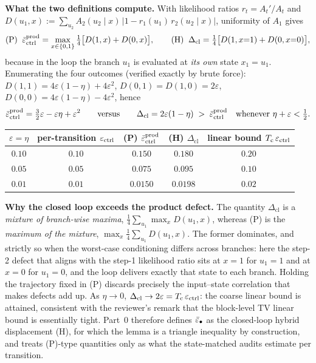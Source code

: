 \documentclass[10pt]{article}
\begin{document}
\noindent\textbf{What the two definitions compute.}
With likelihood ratios $r_t=A_t'/A_t$ and
$D(u_1,x):=\sum_{u_2}A_2(u_2\mid x)\,\lvert 1-r_1(u_1)\,r_2(u_2\mid x)\rvert$,
uniformity of $A_1$ gives
\[
  \text{(P)}\;\; \bar\varepsilon_{\mathrm{ctrl}}^{\mathrm{prod}}=\max_{x\in\{0,1\}}\tfrac14\bigl[D(1,x)+D(0,x)\bigr],
  \qquad
  \text{(H)}\;\; \Delta_{\mathrm{cl}}=\tfrac14\bigl[D(1,x{=}1)+D(0,x{=}0)\bigr],
\]
because in the loop the branch $u_1$ is evaluated at \emph{its own} state
$x_1=u_1$. Enumerating the four outcomes (verified exactly by brute force):
$D(1,1)=4\varepsilon(1-\eta)+4\varepsilon^2$, $D(0,1)=D(1,0)=2\varepsilon$,
$D(0,0)=4\varepsilon(1-\eta)-4\varepsilon^2$, hence
\[
  \bar\varepsilon_{\mathrm{ctrl}}^{\mathrm{prod}}=\tfrac32\varepsilon-\varepsilon\eta+\varepsilon^2
  \qquad\text{versus}\qquad
  \Delta_{\mathrm{cl}}=2\varepsilon(1-\eta)\;>\;\bar\varepsilon_{\mathrm{ctrl}}^{\mathrm{prod}}
  \quad\text{whenever }\eta+\varepsilon<\tfrac12 .
\]
\begin{center}\small
\begin{tabular}{@{}ccccc@{}}
\toprule
$\varepsilon=\eta$ & per-transition $\varepsilon_{\mathrm{ctrl}}$ & (P) $\bar\varepsilon_{\mathrm{ctrl}}^{\mathrm{prod}}$ & (H) $\Delta_{\mathrm{cl}}$ & linear bound $T_{\mathrm{c}}\,\varepsilon_{\mathrm{ctrl}}$ \\
\midrule
$0.10$ & $0.10$ & $0.150$ & $0.180$ & $0.20$ \\
$0.05$ & $0.05$ & $0.075$ & $0.095$ & $0.10$ \\
$0.01$ & $0.01$ & $0.0150$ & $0.0198$ & $0.02$ \\
\bottomrule
\end{tabular}
\end{center}

\noindent\textbf{Why the closed loop exceeds the product defect.}
The quantity $\Delta_{\mathrm{cl}}$ is a \emph{mixture of branch-wise
maxima}, $\tfrac14\sum_{u_1}\max_x D(u_1,x)$, whereas (P) is the
\emph{maximum of the mixture}, $\max_x\tfrac14\sum_{u_1}D(u_1,x)$. The former dominates, and
strictly so when the worst-case conditioning differs across branches: here the step-2
defect that aligns with the step-1 likelihood ratio sits at $x{=}1$ for
$u_1{=}1$ and at $x{=}0$ for $u_1{=}0$, and the loop delivers exactly that
state to each branch. Holding the trajectory fixed in (P) discards precisely
the input--state correlation that makes defects add up. As $\eta\to0$,
$\Delta_{\mathrm{cl}}\to2\varepsilon=T_{\mathrm{c}}\,\varepsilon_{\mathrm{ctrl}}$: the coarse linear
bound is attained, consistent with the reviewer's remark that the block-level
TV linear bound is essentially tight. Part~0 therefore defines
$\bar\varepsilon_{\mathrm{\bullet}}$ as the closed-loop hybrid displacement (H), for which the
lemma is a triangle inequality by construction, and treats (P)-type
quantities only as what the state-matched audits estimate per transition.
\end{document}
